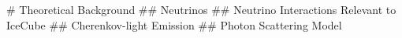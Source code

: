 # Theoretical Background
## Neutrinos
## Neutrino Interactions Relevant to IceCube
## Cherenkov-light Emission
## Photon Scattering Model
